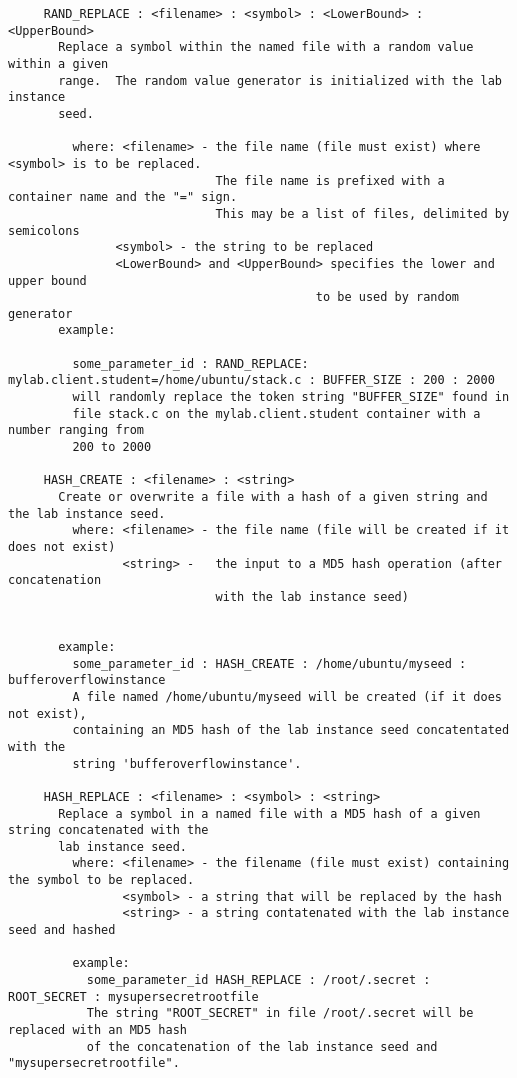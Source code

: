 \documentclass{article}
\begin{document}
\begin{verbatim}
     RAND_REPLACE : <filename> : <symbol> : <LowerBound> : <UpperBound>
       Replace a symbol within the named file with a random value within a given
       range.  The random value generator is initialized with the lab instance
       seed.

         where: <filename> - the file name (file must exist) where <symbol> is to be replaced.
                             The file name is prefixed with a container name and the "=" sign.
                             This may be a list of files, delimited by semicolons 
               <symbol> - the string to be replaced
               <LowerBound> and <UpperBound> specifies the lower and upper bound
                                           to be used by random generator
       example:

         some_parameter_id : RAND_REPLACE: mylab.client.student=/home/ubuntu/stack.c : BUFFER_SIZE : 200 : 2000
         will randomly replace the token string "BUFFER_SIZE" found in
         file stack.c on the mylab.client.student container with a number ranging from 
         200 to 2000
 
     HASH_CREATE : <filename> : <string>
       Create or overwrite a file with a hash of a given string and the lab instance seed.
         where: <filename> - the file name (file will be created if it does not exist)
                <string> -   the input to a MD5 hash operation (after concatenation 
                             with the lab instance seed)
                           
                       
       example:
         some_parameter_id : HASH_CREATE : /home/ubuntu/myseed : bufferoverflowinstance
         A file named /home/ubuntu/myseed will be created (if it does not exist), 
         containing an MD5 hash of the lab instance seed concatentated with the 
         string 'bufferoverflowinstance'.
 
     HASH_REPLACE : <filename> : <symbol> : <string>
       Replace a symbol in a named file with a MD5 hash of a given string concatenated with the
       lab instance seed.
         where: <filename> - the filename (file must exist) containing the symbol to be replaced.
                <symbol> - a string that will be replaced by the hash
                <string> - a string contatenated with the lab instance seed and hashed

         example:
           some_parameter_id HASH_REPLACE : /root/.secret : ROOT_SECRET : mysupersecretrootfile
           The string "ROOT_SECRET" in file /root/.secret will be replaced with an MD5 hash
           of the concatenation of the lab instance seed and "mysupersecretrootfile".
\end{verbatim}
\end{document}
